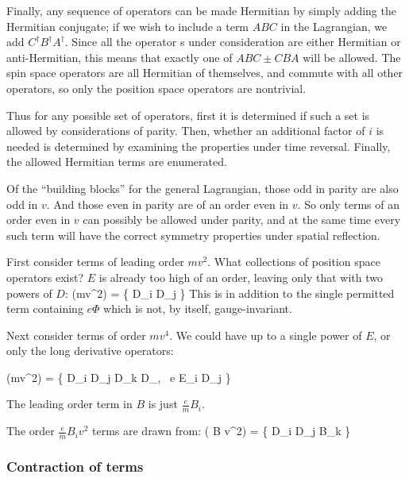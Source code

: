 Finally, any sequence of operators can be made Hermitian by simply adding the Hermitian conjugate; if we wish to include a term $ABC$ in the Lagrangian, we add $C^\dagger B^\dagger A^\dagger$.  Since all the operator	s under consideration are either Hermitian or anti-Hermitian, this means that exactly one of $ABC \pm CBA$ will be allowed.  The spin space operators are all Hermitian of themselves, and commute with all other operators, so only the position space operators are nontrivial.

Thus for any possible set of operators, first it is determined if such a set is allowed by considerations of parity.  Then, whether an additional factor of $i$ is needed is determined by examining the properties under time reversal.  Finally, the allowed Hermitian terms are enumerated.

Of the ``building blocks'' for the general Lagrangian, those odd in parity are also odd in $v$.  And those even in parity are of an order even in $v$.  So only terms of an order even in $v$ can possibly be allowed under parity, and at the same time every such term will have the correct symmetry properties under spatial reflection.

First consider terms of leading order $mv^2$.  What collections of position space operators exist?  $E$ is already too high of an order, leaving only that with two powers of $D$:
\beq
  (mv^2)  = \{  D_i D_j \} 
\eeq
This is in addition to the single permitted term containing $e\Phi$ which is not, by itself, gauge-invariant.
 
 Next consider terms of order $mv^4$.  We could have up to a single power of $E$, or only the long derivative operators:
 
\beq
  (mv^2)  = \{  D_i D_j D_k D_\ell, \,  e E_i D_j \} 
\eeq

The leading order term in $B$ is just $\frac{e}{m}B_i$.

The order $\frac{e}{m} B_i v^2$ terms are drawn from:
\beq
  ( B v^2)  = \{  D_i D_j B_k \}
\eeq


\subsubsection{Contraction of terms}

